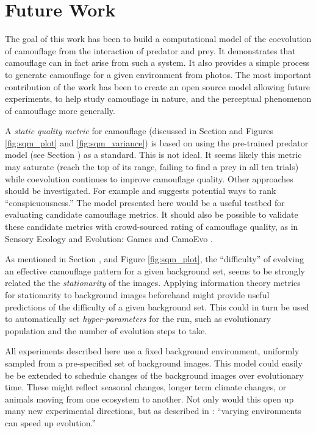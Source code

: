 \documentclass[letterpaper]{article}
\newcommand{\jargon}[1]{\textit{#1}}
\begin{document}
\section{Future Work}
The goal of this work has been to build a computational model of the coevolution of camouflage from the interaction of predator and prey. It demonstrates that camouflage can in fact arise from such a system. It also provides a simple process to generate camouflage for a given environment from photos. The most important contribution of the work has been to create an open source model allowing future experiments, to help study camouflage in nature, and the perceptual phenomenon of camouflage more generally.
\par
A \jargon{static quality metric} for camouflage (discussed in Section  and Figures \ref{fig:sqm_plot} and \ref{fig:sqm_variance}) is based on using the pre-trained predator model (see Section ) as a standard. This is not ideal. It seems likely this metric may saturate (reach the top of its range, failing to find a prey in all ten trials) while coevolution continues to improve camouflage quality. Other approaches should be investigated. For example \citet{lv_cod_2022} and \citet{volonakis_camouflage_2018} suggests potential ways to rank ``conspicuousness.'' The model presented here would be a useful testbed for evaluating candidate camouflage metrics. It should also be possible to validate these candidate metrics with crowd-sourced rating of camouflage quality, as in Sensory Ecology and Evolution: Games \citep{stevens_games_2022} and CamoEvo \citep{hancock_camoevo_2022}.
\par
As mentioned in Section , and Figure \ref{fig:sqm_plot}, the ``difficulty'' of evolving an effective camouflage pattern for a given background set, seems to be strongly related the the \jargon{stationarity} of the images. Applying information theory metrics for stationarity \citep{conni_visual_2021} to background images beforehand might provide useful predictions of the difficulty of a given background set. This could in turn be used to automatically set \jargon{hyper-parameters} for the run, such as evolutionary population and the number of evolution steps to take.
\par
All experiments described here use a fixed background environment, uniformly sampled from a pre-specified set of background images. This model could easily be be extended to schedule changes of the background images over evolutionary time. These might reflect seasonal changes, longer term climate changes, or animals moving from one ecosystem to another. Not only would this open up many new experimental directions, but as described in \citet{kashtan_varying_2007}: ``varying environments can speed up evolution.''
\end{document}
